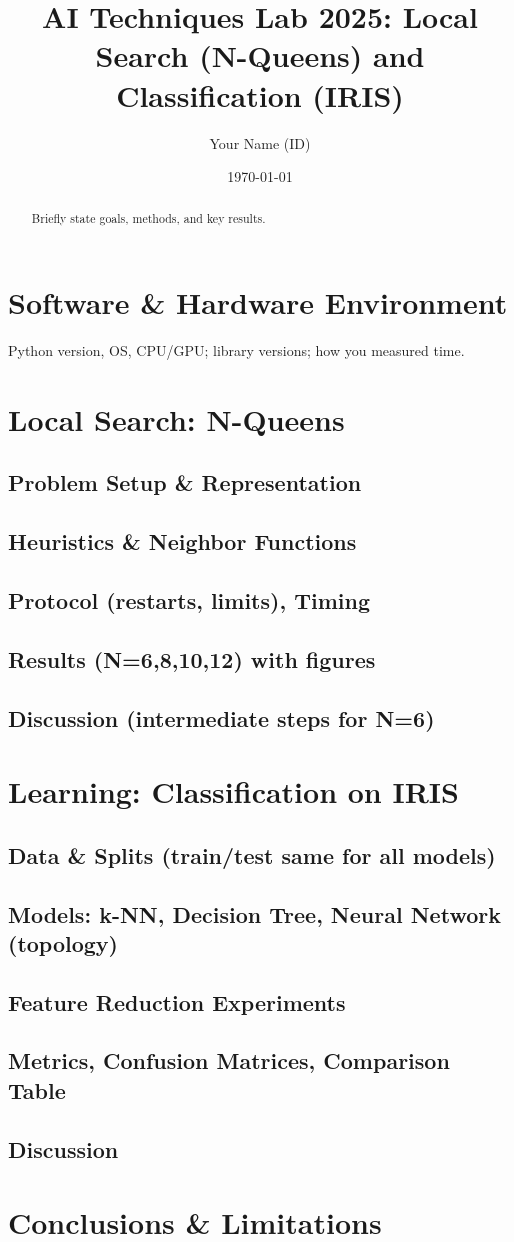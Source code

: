 \documentclass[11pt,a4paper]{article}
\title{AI Techniques Lab 2025: Local Search (N-Queens) and Classification (IRIS)}
\author{Your Name (ID)}
\date{\today}
\begin{document}
\maketitle
\begin{abstract}
Briefly state goals, methods, and key results.
\end{abstract}

\section{Software \& Hardware Environment}
Python version, OS, CPU/GPU; library versions; how you measured time.

\section{Local Search: N-Queens}
\subsection{Problem Setup \& Representation}
\subsection{Heuristics \& Neighbor Functions}
\subsection{Protocol (restarts, limits), Timing}
\subsection{Results (N=6,8,10,12) with figures}
\subsection{Discussion (intermediate steps for N=6)}

\section{Learning: Classification on IRIS}
\subsection{Data \& Splits (train/test same for all models)}
\subsection{Models: k-NN, Decision Tree, Neural Network (topology)}
\subsection{Feature Reduction Experiments}
\subsection{Metrics, Confusion Matrices, Comparison Table}
\subsection{Discussion}

\section{Conclusions \& Limitations}


\end{document}
